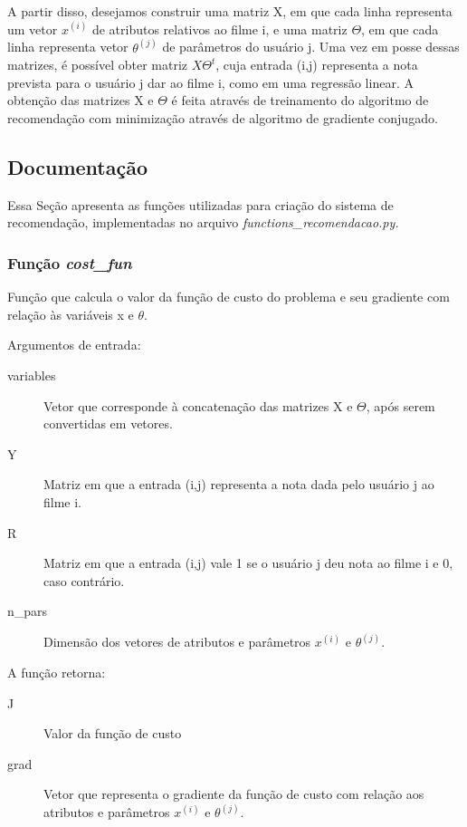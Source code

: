 \documentclass[12pt]{article}
\begin{document}
A partir disso, desejamos construir uma matriz X, em que cada linha representa um vetor $x^{(i)}$ de atributos relativos ao filme i, e uma matriz $\Theta$, em que cada linha representa vetor $\theta^{(j)}$ de parâmetros do usuário j. Uma vez em posse dessas matrizes, é possível obter matriz $X\Theta^t$, cuja entrada (i,j) representa a nota prevista para o usuário j dar ao filme i, como em uma regressão linear. A obtenção das matrizes X e $\Theta$ é feita através de treinamento do algoritmo de recomendação com minimização através de algoritmo de gradiente conjugado.

\subsection{Documentação} \label{doc_rec}
Essa Seção apresenta as funções utilizadas para criação do sistema de recomendação, implementadas no arquivo \textit{functions\_recomendacao.py.}

\subsubsection{Função \textit{cost\_fun}}
Função que calcula o valor da função de custo do problema e seu gradiente com relação às variáveis x e $\theta$.

Argumentos de entrada:

\begin{description}
\item[variables] Vetor que corresponde à concatenação das matrizes X e $\Theta$, após serem convertidas em vetores.
\item[Y] Matriz em que a entrada (i,j) representa a nota dada pelo usuário j ao filme i.
\item[R] Matriz em que a entrada (i,j) vale 1 se o usuário j deu nota ao filme i e 0, caso contrário.
\item[n\_pars] Dimensão dos vetores de atributos e parâmetros $x^{(i)}$ e $\theta^{(j)}$.
\end{description}

A função retorna:

\begin{description}
\item[J] Valor da função de custo
\item[grad] Vetor que representa o gradiente da função de custo com relação aos atributos e parâmetros $x^{(i)}$ e $\theta^{(j)}$.
\end{description}
\end{document}

